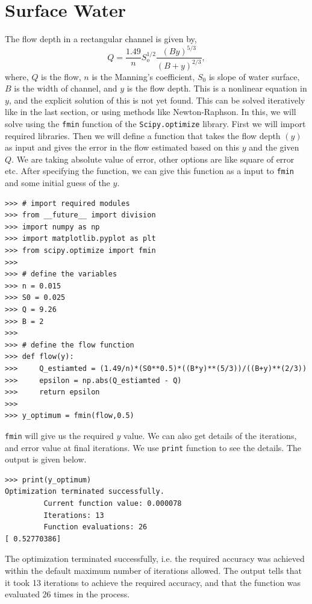 \documentclass[10pt]{book}
\begin{document}
{\section{Surface Water}
The flow depth in a rectangular channel is given by,
\begin{equation}
Q = \frac{1.49}{n}S_o^{1/2}\frac{(By)^{5/3}}{(B+y)^{2/3}},
\end{equation}
where, $Q$ is the flow, $n$ is the Manning's coefficient, $S_0$ is slope of water surface, $B$ is the width of channel, and $y$ is the flow depth. This is a nonlinear equation in $y$, and the explicit solution of this is not yet found. This can be solved iteratively like in the last section, or using methods like Newton-Raphson. In this, we will solve using the \verb"fmin" function of the \verb"Scipy.optimize" library. First we will import required libraries. Then we will define a function that takes the flow depth $(y)$ as input and gives the error in the flow estimated based on this $y$ and the given $Q$. We are taking absolute value of error, other options are like square of error etc. After specifying the function, we can give this function as a input to \verb"fmin" and some initial guess of the $y$.  
\beforeverb \begin{verbatim}
>>> # import required modules
>>> from __future__ import division
>>> import numpy as np
>>> import matplotlib.pyplot as plt
>>> from scipy.optimize import fmin
>>> 
>>> # define the variables
>>> n = 0.015
>>> S0 = 0.025
>>> Q = 9.26
>>> B = 2
>>> 
>>> # define the flow function
>>> def flow(y):
>>>     Q_estiamted = (1.49/n)*(S0**0.5)*((B*y)**(5/3))/((B+y)**(2/3))
>>>     epsilon = np.abs(Q_estiamted - Q)
>>>     return epsilon
>>> 
>>> y_optimum = fmin(flow,0.5)
\end{verbatim} \afterverb
\verb"fmin" will give us the required $y$ value. We can also get details of the iterations, and error value at final iterations. We use \verb"print" function to see the details. The output is given below. 
\beforeverb \begin{verbatim}
>>> print(y_optimum)
Optimization terminated successfully.
         Current function value: 0.000078
         Iterations: 13
         Function evaluations: 26
[ 0.52770386]
\end{verbatim} \afterverb
The optimization terminated successfully, i.e. the required accuracy was achieved within the default maximum number of iterations allowed. The output tells that it took 13 iterations to achieve the required accuracy, and that the function was evaluated 26 times in the process. 

}
\end{document}
